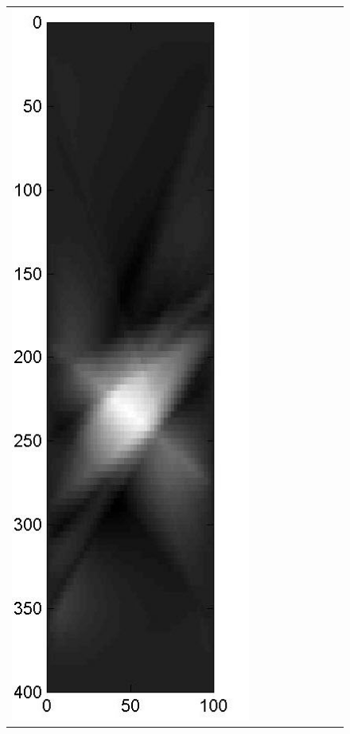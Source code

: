 \documentclass[11pt]{article}
\begin{document}
\begin{figure}[!h]
\begin{center}
\begin{tabular}{|c|c|c|c|c|c|c|c|c|}
			\includegraphics[width=.9\iwidth]{figures/newFigs/noisy/resultsExp-5-mk}
			&

\end{tabular}
\end{center}
\end{figure}
\end{document}
